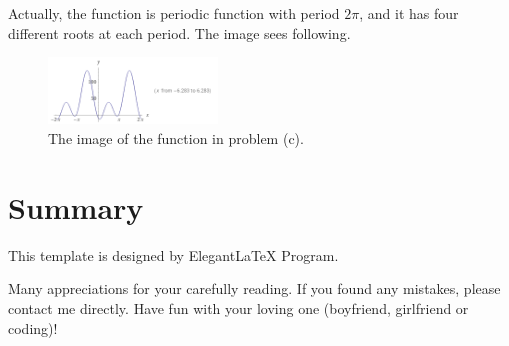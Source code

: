 \documentclass[11pt,en]{elegantpaper}
\begin{document}
Actually, the function is periodic function with period $2\pi$, and it has four different roots at each period. The image sees following.

\begin{figure}[htbp]
  \centering
  \includegraphics[width=0.4\textwidth]{image/fig2.png}
  \caption{The image of the function in problem (c).}
\end{figure}

\section{Summary}

This template is designed by Elegant\LaTeX{} Program.

Many appreciations for your carefully reading. If you found any mistakes, please contact me directly. Have fun with your loving one (boyfriend, girlfriend or coding)!
\end{document}
